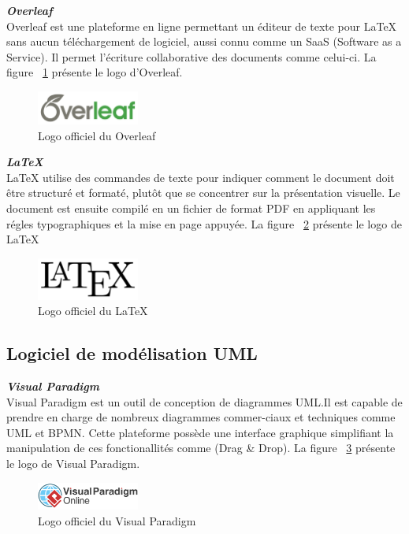 \noindent
{\small\textbf{\textit{Overleaf}}}\mbox{}\\
Overleaf est une plateforme en ligne permettant un éditeur de texte pour LaTeX sans aucun téléchargement de logiciel, aussi connu comme un SaaS (Software as a Service). Il permet l'écriture collaborative des documents comme celui-ci.
La figure ~\ref{fig:overleaf} présente le logo d'Overleaf.
\begin{figure}[H]
\centering
\includegraphics[width=0.3\textwidth]{logos/overleaf.png}
\caption{Logo officiel du Overleaf}
\label{fig:overleaf}
\end{figure}

\noindent
{\small\textbf{\textit{LaTeX}}}\mbox{}\\
LaTeX utilise des commandes de texte pour indiquer comment le document doit être structuré et formaté, plutôt que se concentrer sur la présentation visuelle. Le document est ensuite compilé en un fichier de format PDF en appliquant les régles typographiques et la mise en page appuyée. La figure ~\ref{fig:latex} présente le logo de LaTeX
\begin{figure}[H]
\centering
\includegraphics[width=0.3\textwidth]{logos/latex.png}
\caption{Logo officiel du LaTeX}
\label{fig:latex}
\end{figure}

\subsection{Logiciel de modélisation UML}
\noindent
{\small\textbf{\textit{Visual Paradigm}}}\mbox{}\\
Visual Paradigm est un outil de conception de diagrammes UML.Il est capable de prendre en charge de nombreux diagrammes commer-ciaux et techniques comme UML et BPMN. Cette plateforme possède une interface graphique simplifiant la manipulation de ces fonctionallités comme (Drag \& Drop). La figure ~\ref{fig:vp} présente le logo de Visual Paradigm.

\begin{figure}[H]
\centering
\includegraphics[width=0.3\textwidth]{logos/vp.png}
\caption{Logo officiel du Visual Paradigm}
\label{fig:vp}
\end{figure}

